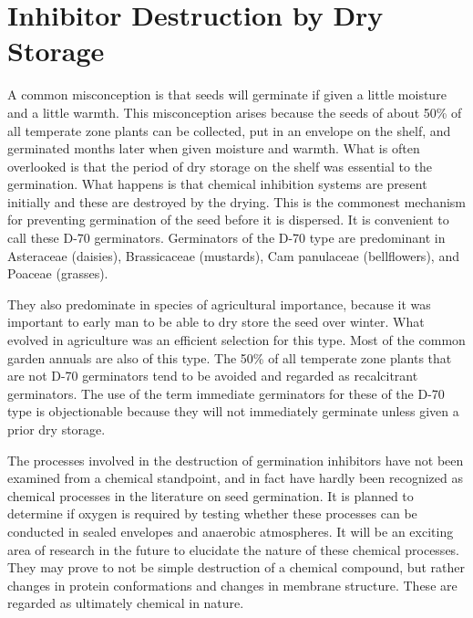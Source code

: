 \chapter{Inhibitor Destruction by Dry Storage}

A common misconception is that seeds will germinate if given a little moisture
and a little warmth. This misconception arises because the seeds of about 50\% of all
temperate zone plants can be collected, put in an envelope on the shelf, and
germinated months later when given moisture and warmth. What is often overlooked
is that the period of dry storage on the shelf was essential to the germination. What
happens is that chemical inhibition systems are present initially and these are
destroyed by the drying. This is the commonest mechanism for preventing
germination of the seed before it is dispersed. It is convenient to call these D-70
germinators. Germinators of the D-70 type are predominant in Asteraceae (daisies),
Brassicaceae (mustards), Cam panulaceae (bellflowers), and Poaceae (grasses).

They also predominate in species of agricultural importance, because it was important
to early man to be able to dry store the seed over winter. What evolved in agriculture
was an efficient selection for this type. Most of the common garden annuals are also of
this type. The 50\% of all temperate zone plants that are not D-70 germinators tend to
be avoided and regarded as recalcitrant germinators. The use of the term immediate
germinators for these of the D-70 type is objectionable because they will not
immediately germinate unless given a prior dry storage.

The processes involved in the destruction of germination inhibitors have not
been examined from a chemical standpoint, and in fact have hardly been recognized
as chemical processes in the literature on seed germination. It is planned to determine
if oxygen is required by testing whether these processes can be conducted in sealed
envelopes and anaerobic atmospheres. It will be an exciting area of research in the
future to elucidate the nature of these chemical processes. They may prove to not be
simple destruction of a chemical compound, but rather changes in protein
conformations and changes in membrane structure. These are regarded as ultimately
chemical in nature.


